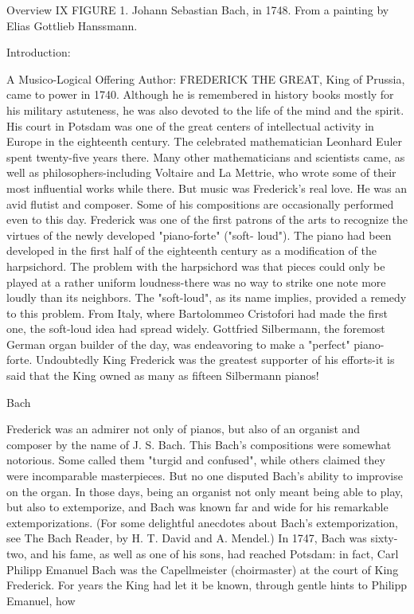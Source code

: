 Overview                                                                                           IX FIGURE 1. Johann Sebastian Bach, in 1748. From a painting by Elias Gottlieb Hanssmann. 







Introduction: 

A Musico-Logical Offering Author: FREDERICK THE GREAT, King of Prussia, came to power in 1740. Although he is remembered in history books mostly for his military astuteness, he was also devoted to the life of the mind and the spirit. His court in Potsdam was one of the great centers of intellectual activity in Europe in the eighteenth century. The celebrated mathematician Leonhard Euler spent twenty-five years there. Many other mathematicians and scientists came, as well as philosophers-including Voltaire and La Mettrie, who wrote some of their most influential works while there. But music was Frederick's real love. He was an avid flutist and composer. Some of his compositions are occasionally performed even to this day. Frederick was one of the first patrons of the arts to recognize the virtues of the newly developed "piano-forte" ("soft- loud"). The piano had been developed in the first half of the eighteenth century as a modification of the harpsichord. The problem with the harpsichord was that pieces could only be played at a rather uniform loudness-there was no way to strike one note more loudly than its neighbors. The "soft-loud", as its name implies, provided a remedy to this problem. From Italy, where Bartolommeo Cristofori had made the first one, the soft-loud idea had spread widely. Gottfried Silbermann, the foremost German organ builder of the day, was endeavoring to make a "perfect" piano-forte. Undoubtedly King Frederick was the greatest supporter of his efforts-it is said that the King owned as many as fifteen Silbermann pianos! 

Bach 

Frederick was an admirer not only of pianos, but also of an organist and composer by the name of J. S. Bach. This Bach's compositions were somewhat notorious. Some called them "turgid and confused", while others claimed they were incomparable masterpieces. But no one disputed Bach's ability to improvise on the organ. In those days, being an organist not only meant being able to play, but also to extemporize, and Bach was known far and wide for his remarkable extemporizations. (For some delightful anecdotes about Bach's extemporization, see The Bach Reader, by H. T. David and A. Mendel.) In 1747, Bach was sixty-two, and his fame, as well as one of his sons, had reached Potsdam: in fact, Carl Philipp Emanuel Bach was the Capellmeister (choirmaster) at the court of King Frederick. For years the King had let it be known, through gentle hints to Philipp Emanuel, how 







